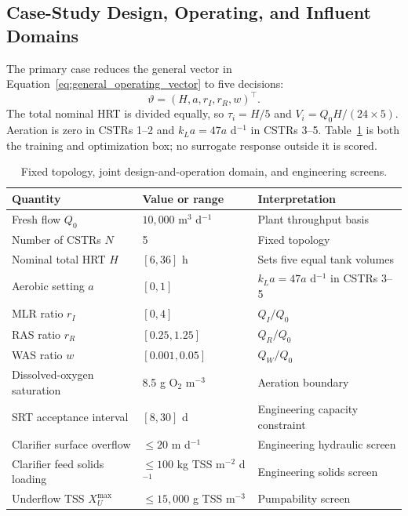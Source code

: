 \documentclass[a4paper,fleqn]{cas-sc}
\begin{document}
\subsection{Case-Study Design, Operating, and Influent Domains}

The primary case reduces the general vector in Equation~\eqref{eq:general_operating_vector} to five decisions:
\begin{equation}
\label{eq:case_operating_vector}
\vartheta=(H,a,r_I,r_R,w)^\top.
\end{equation}
The total nominal HRT is divided equally, so $\tau_i=H/5$ and $V_i=Q_0H/(24\times5)$. Aeration is zero in CSTRs 1--2 and $k_La=47a$ d$^{-1}$ in CSTRs 3--5. Table~\ref{tab:network_domain} is both the training and optimization box; no surrogate response outside it is scored.

\begin{table}[htbp]
\centering
\caption{Fixed topology, joint design-and-operation domain, and engineering screens.}
\label{tab:network_domain}
\scriptsize
\begin{tabular}{lll}
\toprule
Quantity & Value or range & Interpretation \\
\midrule
Fresh flow $Q_0$ & $10{,}000$ m$^3$ d$^{-1}$ & Plant throughput basis \\
Number of CSTRs $N$ & 5 & Fixed topology \\
Nominal total HRT $H$ & $[6,36]$ h & Sets five equal tank volumes \\
Aerobic setting $a$ & $[0,1]$ & $k_La=47a$ d$^{-1}$ in CSTRs 3--5 \\
MLR ratio $r_I$ & $[0,4]$ & $Q_I/Q_0$ \\
RAS ratio $r_R$ & $[0.25,1.25]$ & $Q_R/Q_0$ \\
WAS ratio $w$ & $[0.001,0.05]$ & $Q_W/Q_0$ \\
Dissolved-oxygen saturation & 8.5 g O$_2$ m$^{-3}$ & Aeration boundary \\
SRT acceptance interval & $[8,30]$ d & Engineering capacity constraint \\
Clarifier surface overflow & $\leq20$ m d$^{-1}$ & Engineering hydraulic screen \\
Clarifier feed solids loading & $\leq100$ kg TSS m$^{-2}$ d$^{-1}$ & Engineering solids screen \\
Underflow TSS $X_U^{\max}$ & $\leq15{,}000$ g TSS m$^{-3}$ & Pumpability screen \\
\bottomrule
\end{tabular}
\end{table}
\end{document}
